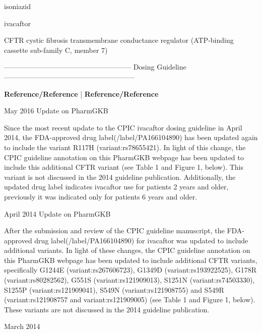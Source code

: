 \documentclass{resume} %
\begin{document}
\begin{rSection}{ isoniazid }
\end{rSection}\begin{rSection}{ ivacaftor }
\item[]
\begin{rSubsection}{ CFTR }{ cystic fibrosis transmembrane conductance regulator (ATP-binding cassette sub-family C, member 7) }{}{}
\item[]
\item[] ------------------------------------------------------ Dosing Guideline --------------------------------------------------------\newline
\item[]
\item[] \textbf{ Reference/Reference } | \textbf{ Reference/Reference }
\item May 2016 Update on PharmGKB
 \newline
\item Since the most recent update to the CPIC ivacaftor dosing guideline in April 2014, the FDA-approved drug label(/label/PA166104890) has been updated again to include the variant R117H (variant:rs78655421). In light of this change, the CPIC guideline annotation on this PharmGKB webpage has been updated to include this additional CFTR variant (see Table 1 and Figure 1, below). This variant is not discussed in the 2014 guideline publication. Additionally, the updated drug label indicates ivacaftor use for patients 2 years and older,  previously it was indicated only for patients 6 years and older. 
 \newline
\item April 2014 Update on PharmGKB
 \newline
\item After the submission and review of the CPIC guideline manuscript, the FDA-approved drug label(/label/PA166104890) for ivacaftor was updated to include additional variants. In light of these changes, the CPIC guideline annotation on this PharmGKB webpage has been updated to include additional CFTR variants, specifically G1244E (variant:rs267606723), G1349D (variant:rs193922525), G178R (variant:rs80282562), G551S (variant:rs121909013), S1251N (variant:rs74503330), S1255P (variant:rs121909041), S549N (variant:rs121908755) and S549R (variant:rs121908757 and variant:rs121909005) (see Table 1 and Figure 1, below).  These variants are not discussed in the 2014 guideline publication.
 \newline
\item March 2014
 \newline

\end{rSubsection}
\end{rSection}
\end{document}
